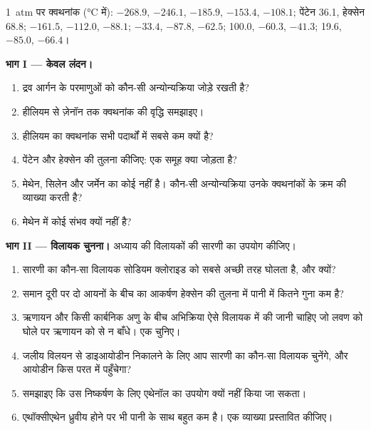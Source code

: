 \begin{problem}
\label{pb:b1:intermolecular-forces-solvents:1}
\qty{1}{atm} पर क्वथनांक (\unit{\celsius} में):  $-268.9$,
 $-246.1$,  $-185.9$,  $-153.4$,  $-108.1$;
पेंटेन 36.1, हेक्सेन 68.8;  $-161.5$,  $-112.0$,
 $-88.1$;  $-33.4$,  $-87.8$,  $-62.5$;
 100.0,  $-60.3$,  $-41.3$;  19.6,
 $-85.0$,  $-66.4$।

\medskip
\noindent\textbf{भाग I --- केवल लंदन।}
\begin{enumerate}
  \item द्रव आर्गन के परमाणुओं को कौन-सी अन्योन्यक्रिया जोड़े रखती है?
  \item हीलियम से ज़ेनॉन तक क्वथनांक की वृद्धि समझाइए।
  \item हीलियम का क्वथनांक सभी पदार्थों में सबसे कम क्यों है?
  \item पेंटेन और हेक्सेन की तुलना कीजिए: एक  समूह क्या जोड़ता है?
  \item मेथेन, सिलेन और जर्मेन का कोई  नहीं है। कौन-सी
        अन्योन्यक्रिया उनके क्वथनांकों के क्रम की व्याख्या करती है?
  \item मेथेन में कोई  संभव क्यों नहीं है?
\end{enumerate}

\medskip
\noindent\textbf{भाग II --- विलायक चुनना।}
अध्याय की विलायकों की सारणी का उपयोग कीजिए।
\begin{enumerate}[resume]
  \item सारणी का कौन-सा विलायक सोडियम क्लोराइड को सबसे अच्छी तरह घोलता है, और
        क्यों?
  \item समान दूरी पर दो आयनों के बीच का आकर्षण हेक्सेन की तुलना में पानी में
        कितने गुना कम है?
  \item ऋणायन  और किसी कार्बनिक अणु के बीच अभिक्रिया ऐसे विलायक में
        की जानी चाहिए जो लवण को घोले पर ऋणायन को  से
        न बाँधे। एक चुनिए।
  \item जलीय विलयन से डाइआयोडीन निकालने के लिए आप सारणी का कौन-सा
        विलायक चुनेंगे, और आयोडीन किस परत में पहुँचेगा?
  \item समझाइए कि उस निष्कर्षण के लिए एथेनॉल का उपयोग क्यों नहीं किया जा सकता।
  \item एथॉक्सीएथेन ध्रुवीय होने पर भी पानी के साथ बहुत कम  है।
        एक व्याख्या प्रस्तावित कीजिए।
\end{enumerate}


\end{problem}
